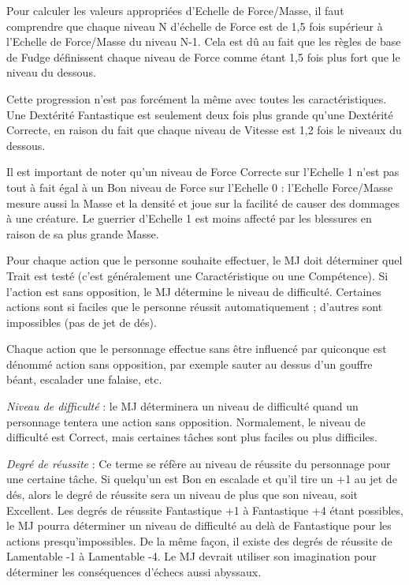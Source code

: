 \documentclass{article}
\newcommand{\mysection}[1]{
\vspace{0.2cm}
\noindent{\large \textbf{#1}}
}
\newcommand{\mysubsection}[1]{
\vspace{0.1cm}
\noindent{\textit{\textbf{#1}}}
}
\begin{document}
\begin{multicols*}{3}
Pour calculer les valeurs appropriées d'Echelle de Force/Masse, il faut comprendre que chaque niveau N d'échelle de Force est de 1,5 fois supérieur à l'Echelle de Force/Masse du niveau N-1. Cela est dû au fait que les règles de base de Fudge définissent chaque niveau de Force comme étant 1,5 fois plus fort que le niveau du dessous.

Cette progression n'est pas forcément la même avec toutes les caractéristiques. Une Dextérité Fantastique est seulement deux fois plus grande qu'une Dextérité Correcte, en raison du fait que chaque niveau de Vitesse est 1,2 fois le niveaux du dessous.

Il est important de noter qu'un niveau de Force Correcte sur l'Echelle 1 n'est pas tout à fait égal à un Bon niveau de Force sur l'Echelle 0 : l'Echelle Force/Masse mesure aussi la Masse et la densité et joue sur la facilité de causer des dommages à une créature. Le guerrier d'Echelle 1 est moins affecté par les blessures en raison de sa plus grande Masse.

\mysection{Résolution des actions}

Pour chaque action que le personne souhaite effectuer, le MJ doit déterminer quel Trait est testé (c'est généralement une Caractéristique ou une Compétence). Si l'action est sans opposition, le MJ détermine le niveau de difficulté. Certaines actions sont si faciles que le personne réussit automatiquement ; d'autres sont impossibles (pas de jet de dés).

\mysubsection{Actions sans opposition}

Chaque action que le personnage effectue sans être influencé par quiconque est dénommé action sans opposition, par exemple sauter au dessus d'un gouffre béant, escalader une falaise, etc.

\textit{Niveau de difficulté} : le MJ déterminera un niveau de difficulté quand un personnage tentera une action sans opposition. Normalement, le niveau de difficulté est Correct, mais certaines tâches sont plus faciles ou plus difficiles.

\textit{Degré de réussite} : Ce terme se réfère au niveau de réussite du personnage pour une certaine tâche. Si quelqu'un est Bon en escalade et qu'il tire un +1 au jet de dés, alors le degré de réussite sera un niveau de plus que son niveau, soit Excellent. Les degrés de réussite Fantastique +1 à Fantastique +4 étant possibles, le MJ pourra déterminer un niveau de difficulté au delà de Fantastique pour les actions presqu'impossibles. De la même façon, il existe des degrés de réussite de Lamentable -1 à Lamentable -4. Le MJ devrait utiliser son imagination pour déterminer les conséquences d'échecs aussi abyssaux.


\end{multicols*}
\end{document}
